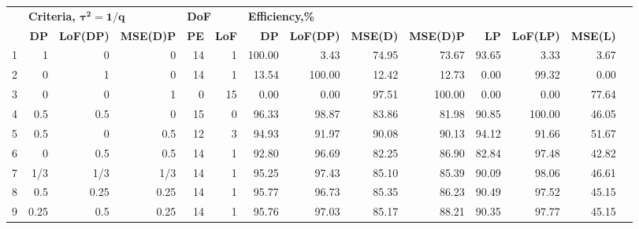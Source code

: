 \begin{table}[h]
{\begin{tabular}{rrrrrrrrrrrrrr}
   & \multicolumn{3}{l}{\textbf{Criteria, $\bm{\tau^2=1/q}$}} & \multicolumn{2}{l}{\textbf{DoF}} & \multicolumn{6}{l}{\textbf{Efficiency,\%}}                               \\
   & \textbf{DP}       & \textbf{LoF(DP)}    & \textbf{MSE(D)P} & \textbf{PE}        & \textbf{LoF}        & \textbf{DP}   & \textbf{LoF(DP)}   & \textbf{MSE(D)} & \textbf{MSE(D)P} & \textbf{LP}       & \textbf{LoF(LP)}   & \textbf{MSE(L)}  \\
1  & 1    & 0    & 0    & \multicolumn{1}{|r}{14} & \multicolumn{1}{r|}{1}  & 100.00 & 3.43   & 74.95 & \multicolumn{1}{|r}{73.67}  & \multicolumn{1}{|r}{93.65} & 3.33   & 3.67  \\
2  & 0    & 1    & 0    & \multicolumn{1}{|r}{14} & \multicolumn{1}{r|}{1}  & 13.54  & 100.00 & 12.42 & \multicolumn{1}{|r}{12.73}  & \multicolumn{1}{|r}{0.00}  & 99.32  & 0.00  \\
3  & 0    & 0    & 1    & \multicolumn{1}{|r}{0} & \multicolumn{1}{r|}{15} & 0.00   & 0.00   & 97.51 & \multicolumn{1}{|r}{100.00} & \multicolumn{1}{|r}{0.00}  & 0.00   & 77.64 \\
4  & 0.5  & 0.5  & 0    & \multicolumn{1}{|r}{15} & \multicolumn{1}{r|}{0} & 96.33  & 98.87  & 83.86 & \multicolumn{1}{|r}{81.98}  & \multicolumn{1}{|r}{90.85} & 100.00 & 46.05 \\
5  & 0.5  & 0    & 0.5  & \multicolumn{1}{|r}{12} & \multicolumn{1}{r|}{3} & 94.93  & 91.97  & 90.08 & \multicolumn{1}{|r}{90.13}  & \multicolumn{1}{|r}{94.12} & 91.66  & 51.67 \\
6  & 0    & 0.5  & 0.5  & \multicolumn{1}{|r}{14} & \multicolumn{1}{r|}{1} & 92.80  & 96.69  & 82.25 & \multicolumn{1}{|r}{86.90}  & \multicolumn{1}{|r}{82.84} & 97.48  & 42.82 \\
7  & 1/3  & 1/3  & 1/3  & \multicolumn{1}{|r}{14} & \multicolumn{1}{r|}{1} & 95.25  & 97.43  & 85.10 & \multicolumn{1}{|r}{85.39}  & \multicolumn{1}{|r}{90.09} & 98.06  & 46.61 \\
8  & 0.5  & 0.25 & 0.25 & \multicolumn{1}{|r}{14} & \multicolumn{1}{r|}{1} & 95.77  & 96.73  & 85.35 & \multicolumn{1}{|r}{86.23}  & \multicolumn{1}{|r}{90.49} & 97.52  & 45.15 \\
9  & 0.25 & 0.5  & 0.25 & \multicolumn{1}{|r}{14} & \multicolumn{1}{r|}{1} & 95.76  & 97.03  & 85.17 & \multicolumn{1}{|r}{88.21}  & \multicolumn{1}{|r}{90.35} & 97.77  & 45.15
\end{tabular}
}
\end{table}

